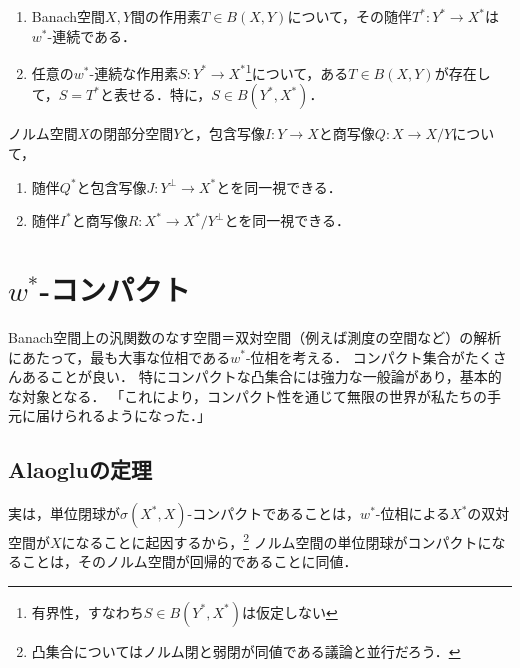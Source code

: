 \documentclass[uplatex,dvipdfmx]{jsreport}
\begin{document}
\begin{proposition}[随伴の特徴付け]\mbox{}
    \begin{enumerate}
        \item Banach空間$X,Y$間の作用素$T\in B(X,Y)$について，その随伴$T^*:Y^*\to X^*$は$w^*$-連続である．
        \item 任意の$w^*$-連続な作用素$S:Y^*\to X^*$\footnote{有界性，すなわち$S\in B(Y^*,X^*)$は仮定しない}について，ある$T\in B(X,Y)$が存在して，$S=T^*$と表せる．特に，$S\in B(Y^*,X^*)$．
    \end{enumerate}
\end{proposition}

\begin{proposition}\label{prop-標準写像の随伴}
    ノルム空間$X$の閉部分空間$Y$と，包含写像$I:Y\to X$と商写像$Q:X\to X/Y$について，
    \begin{enumerate}
        \item 随伴$Q^*$と包含写像$J:Y^\perp\to X^*$とを同一視できる．
        \item 随伴$I^*$と商写像$R:X^*\to X^*/Y^\perp$とを同一視できる．
    \end{enumerate}
\end{proposition}

\section{$w^*$-コンパクト}

\begin{tcolorbox}[colframe=ForestGreen, colback=ForestGreen!10!white,breakable,colbacktitle=ForestGreen!40!white,coltitle=black,fonttitle=\bfseries\sffamily,
title=この位相が，無限をコンパクトに翻訳し，取扱可能にしてくれる．]
    Banach空間上の汎関数のなす空間＝双対空間（例えば測度の空間など）の解析にあたって，最も大事な位相である$w^*$-位相を考える．
    コンパクト集合がたくさんあることが良い．
    特にコンパクトな凸集合には強力な一般論があり，基本的な対象となる．
    「これにより，コンパクト性を通じて無限の世界が私たちの手元に届けられるようになった．」\cite{作用素環}
\end{tcolorbox}

\subsection{Alaogluの定理}

\begin{tcolorbox}[colframe=ForestGreen, colback=ForestGreen!10!white,breakable,colbacktitle=ForestGreen!40!white,coltitle=black,fonttitle=\bfseries\sffamily,
title=]
    実は，単位閉球が$\sigma(X^*,X)$-コンパクトであることは，$w^*$-位相による$X^*$の双対空間が$X$になることに起因するから，\footnote{凸集合についてはノルム閉と弱閉が同値である議論と並行だろう．}
    ノルム空間の単位閉球がコンパクトになることは，そのノルム空間が回帰的であることに同値．
\end{tcolorbox}
\end{document}
